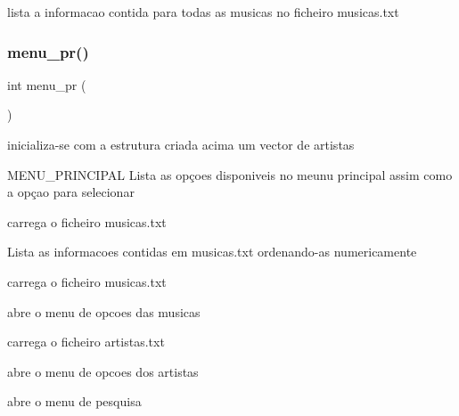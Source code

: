lista a informacao contida para todas as musicas no ficheiro musicas.\+txt \mbox{\label{menu__pr_8c_a5b211bda275b9a60f9dac70877e9622e}} 
\subsubsection{menu\_pr()}
{\footnotesize\ttfamily int menu\+\_\+pr (\begin{DoxyParamCaption}{ }\end{DoxyParamCaption})}



inicializa-\/se com a estrutura criada acima um vector de artistas 

M\+E\+N\+U\+\_\+\+P\+R\+I\+N\+C\+I\+P\+AL Lista as opçoes disponiveis no meunu principal assim como a opçao para selecionar

carrega o ficheiro musicas.\+txt

Lista as informacoes contidas em musicas.\+txt ordenando-\/as numericamente

carrega o ficheiro musicas.\+txt

abre o menu de opcoes das musicas

carrega o ficheiro artistas.\+txt

abre o menu de opcoes dos artistas

abre o menu de pesquisa 